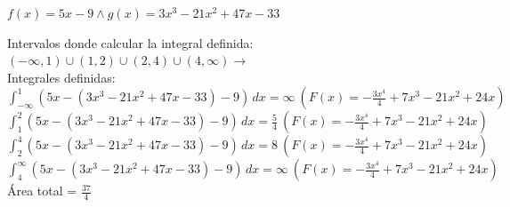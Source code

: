 \documentclass[spanish, 11pt]{exam}
\begin{document}
\begin{questions}
\begin{multicols}{1}
\begin{parts}
    $f(x) = 5x-9 \land g(x) = 3x^3 -21x^2 +47x-33$  \begin{solution}   Intervalos donde calcular la integral definida: \ $\left(-\infty, 1\right) \cup \left(1, 2\right) \cup \left(2, 4\right) \cup \left(4, \infty\right) \to $ \\ Integrales definidas: \\ $\int_{-\infty}^{1} \left(5 x - \left(3 x^{3} - 21 x^{2} + 47 x - 33\right) - 9\right)\, dx=\infty \ (F(x)=- \frac{3 x^{4}}{4} + 7 x^{3} - 21 x^{2} + 24 x)$  \\ $\int_{1}^{2} \left(5 x - \left(3 x^{3} - 21 x^{2} + 47 x - 33\right) - 9\right)\, dx=\frac{5}{4} \ (F(x)=- \frac{3 x^{4}}{4} + 7 x^{3} - 21 x^{2} + 24 x)$  \\ $\int_{2}^{4} \left(5 x - \left(3 x^{3} - 21 x^{2} + 47 x - 33\right) - 9\right)\, dx=8 \ (F(x)=- \frac{3 x^{4}}{4} + 7 x^{3} - 21 x^{2} + 24 x)$  \\ $\int_{4}^{\infty} \left(5 x - \left(3 x^{3} - 21 x^{2} + 47 x - 33\right) - 9\right)\, dx=\infty \ (F(x)=- \frac{3 x^{4}}{4} + 7 x^{3} - 21 x^{2} + 24 x)$  \\ Área total = $\frac{37}{4}$   \end{solution}
        \end{parts}
        \end{multicols}
        
    \end{questions}
    
\end{document}
